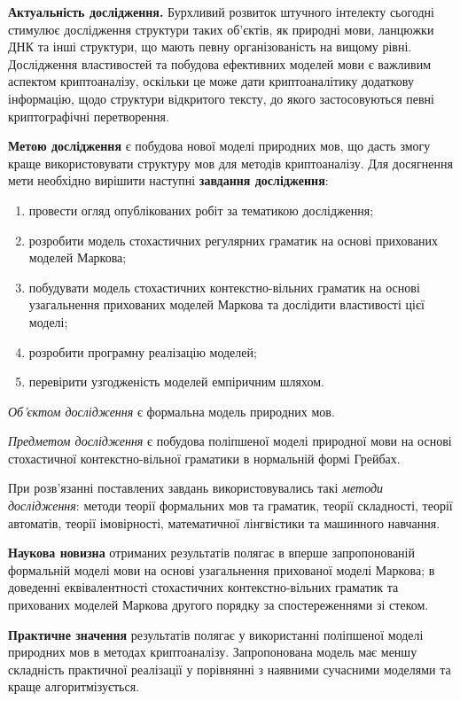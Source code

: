 \textbf{Актуальність дослідження.} Бурхливий розвиток штучного інтелекту сьогодні
стимулює дослідження структури таких об'єктів, як природні мови, ланцюжки ДНК та інші структури, що
мають певну організованість на вищому рівні. Дослідження властивостей та побудова ефективних
моделей мови є важливим аспектом криптоаналізу, оскільки це може дати криптоаналітику додаткову
інформацію, щодо структури відкритого тексту, до якого застосовуються певні криптографічні перетворення.

\textbf{Метою дослідження} є побудова нової моделі природних мов, що дасть змогу краще
використовувати структуру мов для методів криптоаналізу. Для досягнення мети необхідно
вирішити наступні \textbf{завдання дослідження}:


\begin{enumerate}
\item провести огляд опублікованих робіт за тематикою дослідження;
\item розробити модель стохастичних регулярних граматик на основі прихованих моделей Маркова;
\item побудувати модель стохастичних контекстно-вільних граматик на основі узагальнення прихованих моделей Маркова та дослідити властивості цієї моделі;
\item розробити програмну реалізацію моделей;
\item перевірити узгодженість моделей емпіричним шляхом.
\end{enumerate}

\emph{Об'єктом дослідження} є формальна модель природних мов.

\emph{Предметом дослідження} є побудова поліпшеної моделі природної мови на основі стохастичної контекстно-вільної граматики в нормальній формі Грейбах.

При розв’язанні поставлених завдань використовувались такі \emph{методи дослідження}: методи теорії формальних мов та граматик,
теорії складності, теорії автоматів, теорії імовірності, математичної лінгвістики та машинного навчання.

\textbf{Наукова новизна} отриманих результатів полягає в вперше запропонованій формальній моделі мови на основі узагальнення прихованої моделі Маркова; в доведенні еквівалентності стохастичних контекстно-вільних граматик та прихованих моделей Маркова другого порядку за спостереженнями зі стеком.

\textbf{Практичне значення} результатів полягає у використанні поліпшеної моделі природних мов в методах криптоаналізу. Запропонована модель має меншу складність практичної реалізації у порівнянні з наявними сучасними моделями та краще алгоритмізується.

